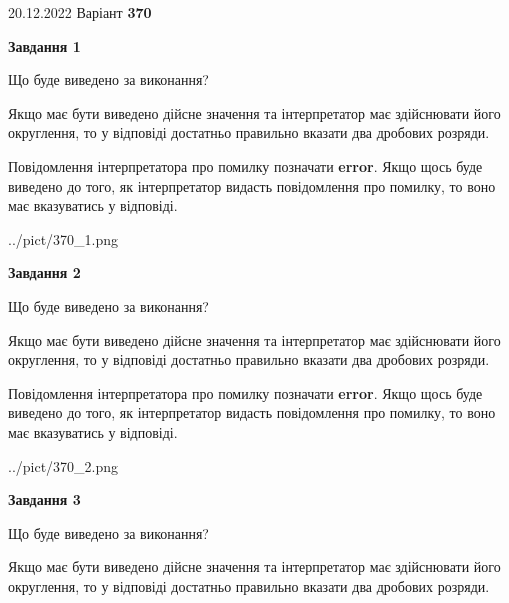 \documentclass[12pt, ukrainian]{article}
\begin{document}
{20.12.2022 Варіант \No \textbf { 370 }\par}
{
\begin {Large}

{\begin {center}\textbf{Завдання 1}\end {center}}\par
Що буде виведено за виконання? \par

Якщо має бути виведено дійсне значення та інтерпретатор має здійснювати його округлення, 
то у відповіді достатньо правильно вказати два дробових розряди.

Повідомлення інтерпретатора про помилку позначати \textbf{error}.
Якщо щось буде виведено до того, як інтерпретатор видасть повідомлення про помилку, 
то воно має вказуватись у відповіді. \par

\begin{center}
	{../pict/370_1.png}
\end{center}
\newpage

{\begin {center}\textbf{Завдання 2}\end {center}}\par
Що буде виведено за виконання? \par

Якщо має бути виведено дійсне значення та інтерпретатор має здійснювати його округлення, 
то у відповіді достатньо правильно вказати два дробових розряди.

Повідомлення інтерпретатора про помилку позначати \textbf{error}.
Якщо щось буде виведено до того, як інтерпретатор видасть повідомлення про помилку, 
то воно має вказуватись у відповіді. \par

\begin{center}
	{../pict/370_2.png}
\end{center}
\newpage

{\begin {center}\textbf{Завдання 3}\end {center}}\par
Що буде виведено за виконання? \par

Якщо має бути виведено дійсне значення та інтерпретатор має здійснювати його округлення, 
то у відповіді достатньо правильно вказати два дробових розряди.


\end{Large}}
\end{document}

